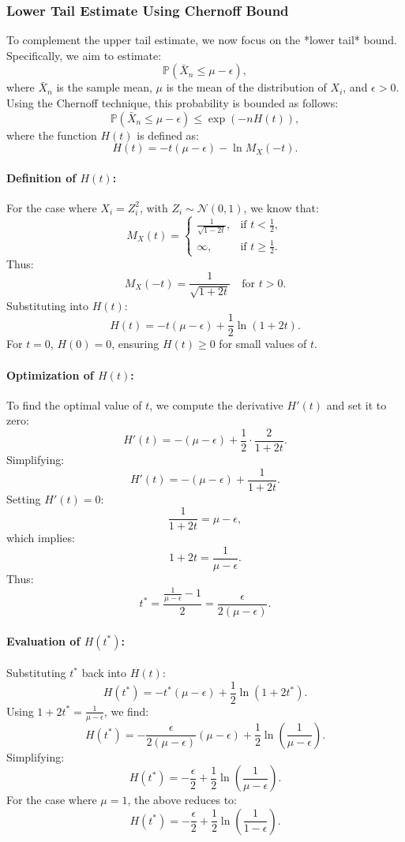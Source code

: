 \subsubsection{Lower Tail Estimate Using Chernoff Bound}

To complement the upper tail estimate, we now focus on the *lower tail* bound. Specifically, we aim to estimate:
\[
\mathbb{P}\left(\bar{X}_n \leq \mu - \epsilon\right),
\]
where \( \bar{X}_n \) is the sample mean, \(\mu\) is the mean of the distribution of \(X_i\), and \(\epsilon > 0\). Using the Chernoff technique, this probability is bounded as follows:
\[
\mathbb{P}\left(\bar{X}_n \leq \mu - \epsilon\right) \leq \exp\left(-n H(t)\right),
\]
where the function \( H(t) \) is defined as:
\[
H(t) = -t (\mu - \epsilon) - \ln M_X(-t).
\]

\paragraph{Definition of \(H(t)\):}
For the case where \(X_i = Z_i^2\), with \(Z_i \sim \mathcal{N}(0, 1)\), we know that:
\[
M_X(t) = \begin{cases}
\frac{1}{\sqrt{1 - 2t}}, & \text{if } t < \frac{1}{2}, \\
\infty, & \text{if } t \geq \frac{1}{2}.
\end{cases}
\]
Thus:
\[
M_X(-t) = \frac{1}{\sqrt{1 + 2t}} \quad \text{for } t > 0.
\]
Substituting into \(H(t)\):
\[
H(t) = -t (\mu - \epsilon) + \frac{1}{2} \ln(1 + 2t).
\]
For \( t = 0 \), \( H(0) = 0 \), ensuring \(H(t) \geq 0\) for small values of \(t\).

\paragraph{Optimization of \(H(t)\):}
To find the optimal value of \(t\), we compute the derivative \(H'(t)\) and set it to zero:
\[
H'(t) = -(\mu - \epsilon) + \frac{1}{2} \cdot \frac{2}{1 + 2t}.
\]
Simplifying:
\[
H'(t) = -(\mu - \epsilon) + \frac{1}{1 + 2t}.
\]
Setting \(H'(t) = 0\):
\[
\frac{1}{1 + 2t} = \mu - \epsilon,
\]
which implies:
\[
1 + 2t = \frac{1}{\mu - \epsilon}.
\]
Thus:
\[
t^* = \frac{\frac{1}{\mu - \epsilon} - 1}{2} = \frac{\epsilon}{2(\mu - \epsilon)}.
\]

\paragraph{Evaluation of \(H(t^*)\):}
Substituting \(t^*\) back into \(H(t)\):
\[
H(t^*) = -t^*(\mu - \epsilon) + \frac{1}{2} \ln(1 + 2t^*).
\]
Using \(1 + 2t^* = \frac{1}{\mu - \epsilon}\), we find:
\[
H(t^*) = -\frac{\epsilon}{2(\mu - \epsilon)}(\mu - \epsilon) + \frac{1}{2} \ln\left(\frac{1}{\mu - \epsilon}\right).
\]
Simplifying:
\[
H(t^*) = -\frac{\epsilon}{2} + \frac{1}{2} \ln\left(\frac{1}{\mu - \epsilon}\right).
\]
For the case where \(\mu = 1\), the above reduces to:
\[
H(t^*) = -\frac{\epsilon}{2} + \frac{1}{2} \ln\left(\frac{1}{1 - \epsilon}\right).
\]

